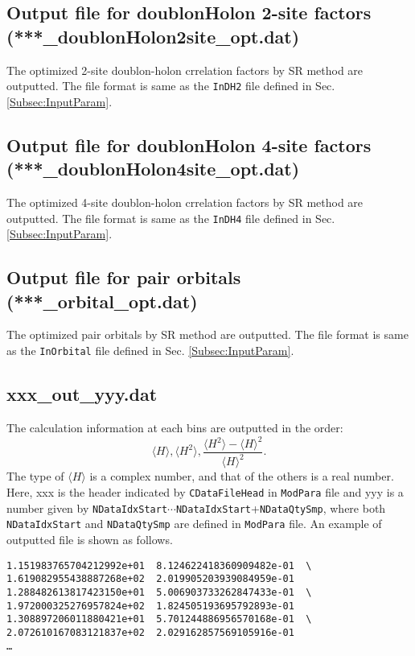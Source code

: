 \subsection{Output file for doublonHolon 2-site factors \\(***\_doublonHolon2site\_opt.dat)}
The optimized 2-site doublon-holon crrelation factors  by SR method are outputted. The file format is same as the \verb|InDH2| file defined in Sec. \ref{Subsec:InputParam}.

\subsection{Output file for doublonHolon 4-site factors \\(***\_doublonHolon4site\_opt.dat)}
The optimized 4-site doublon-holon crrelation factors  by SR method are outputted. The file format is same as the \verb|InDH4| file defined in Sec. \ref{Subsec:InputParam}.

\subsection{Output file for pair orbitals \\(***\_orbital\_opt.dat)}
The optimized pair orbitals by SR method are outputted. The file format is same as the \verb|InOrbital| file defined in Sec. \ref{Subsec:InputParam}.

\subsection{xxx\_out\_yyy.dat}
The calculation information at each bins are outputted in the order:
\begin{equation}
\langle H \rangle, \langle H^2 \rangle, \frac{\langle H^2 \rangle- \langle H \rangle^2 }{\langle H \rangle^2} \nonumber.
\end{equation}
The type of $\langle H \rangle$ is a complex number, and that of the others is a real number.
Here, xxx is the header indicated by \verb|CDataFileHead| in \verb|ModPara| file and yyy is a number given by \verb|NDataIdxStart|$\cdots$\verb|NDataIdxStart|+\verb|NDataQtySmp|, where both \verb|NDataIdxStart| and \verb|NDataQtySmp| are defined in \verb|ModPara| file.
An example of outputted file is shown as follows.

\begin{minipage}{13cm}
\begin{screen}
\begin{verbatim}
1.151983765704212992e+01  8.124622418360909482e-01  \
1.619082955438887268e+02  2.019905203939084959e-01 
1.288482613817423150e+01  5.006903733262847433e-01  \ 
1.972000325276957824e+02  1.824505193695792893e-01
1.308897206011880421e+01  5.701244886956570168e-01  \
2.072610167083121837e+02  2.029162857569105916e-01
…
\end{verbatim}
\end{screen}
\end{minipage}

